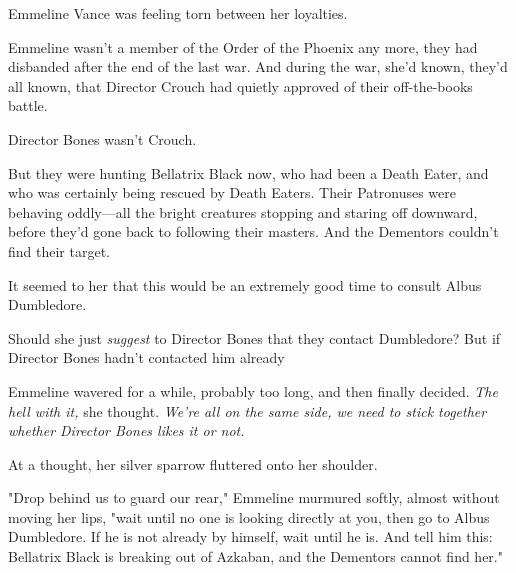 Emmeline Vance was feeling torn between her loyalties.

Emmeline wasn't a member of the Order of the Phoenix any more, they had
disbanded after the end of the last war. And during the war, she'd known,
they'd all known, that Director Crouch had quietly approved of their
off-the-books battle.

Director Bones wasn't Crouch.

But they were hunting Bellatrix Black now, who had been a Death Eater, and who
was certainly being rescued by Death Eaters. Their Patronuses were behaving
oddly---all the bright creatures stopping and staring off downward, before
they'd gone back to following their masters. And the Dementors couldn't find
their target.

It seemed to her that this would be an extremely good time to consult Albus
Dumbledore.

Should she just \emph{suggest} to Director Bones that they contact Dumbledore?
But if Director Bones hadn't contacted him already{\el}

Emmeline wavered for a while, probably too long, and then finally decided.
\emph{The hell with it,} she thought. \emph{We're all on the same side, we need
to stick together whether Director Bones likes it or not.}

At a thought, her silver sparrow fluttered onto her shoulder.

"Drop behind us to guard our rear," Emmeline murmured softly, almost without
moving her lips, "wait until no one is looking directly at you, then go to
Albus Dumbledore. If he is not already by himself, wait until he is. And tell
him this: Bellatrix Black is breaking out of Azkaban, and the Dementors cannot
find her."
